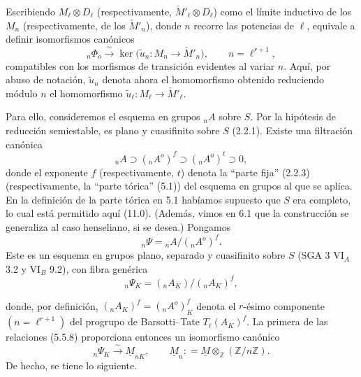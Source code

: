 Escribiendo $M_\ell\otimes D_\ell$ (respectivamente,
$\check M'_\ell\otimes D_\ell$) como el límite inductivo de los $M_n$
(respectivamente, de los $\check M'_n$), donde $n$ recorre las
potencias de $\ell$, equivale a definir isomorfismos canónicos
\begin{equation}\tag{11.6.4}
{}_n\Phi_o\xrightarrow{\ \sim\ }
 \ker\bigl(\widetilde u_n:M_n\longrightarrow\check M'_n\bigr),
 \qquad n=\ell^{r+1},
\end{equation}
compatibles con los morfismos de transición evidentes al variar $n$.
Aquí, por abuso de notación, $\widetilde u_n$ denota ahora el
homomorfismo obtenido reduciendo módulo $n$ el homomorfismo
$\widetilde u_\ell:M_\ell\longrightarrow\check M'_\ell$.

Para ello, consideremos el esquema en grupos ${}_nA$ sobre $S$. Por la
hipótesis de reducción semiestable, es plano y cuasifinito sobre $S$
(2.2.1). Existe una filtración canónica
\begin{equation}\tag{11.6.5}
{}_nA\supset({}_nA^o)^f\supset({}_nA^o)^t\supset0,
\end{equation}
donde el exponente $f$ (respectivamente, $t$) denota la ``parte fija''
(2.2.3) (respectivamente, la ``parte tórica'' (5.1)) del esquema en
grupos al que se aplica. En la definición de la parte tórica en 5.1
habíamos supuesto que $S$ era completo, lo cual está permitido aquí
(11.0). (Además, vimos en 6.1 que la construcción se generaliza al caso
henseliano, si se desea.) Pongamos
\begin{equation}\tag{11.6.6}
{}_n\Psi={}_nA/({}_nA^o)^f.
\end{equation}
Este es un esquema en grupos plano, separado y cuasifinito sobre $S$
(SGA 3 $\mathrm{VI}_A$ 3.2 y $\mathrm{VI}_B$ 9.2), con fibra genérica
\begin{equation*}
{}_n\Psi_K=({}_nA_K)/({}_nA_K)^f,
\end{equation*}


donde, por definición,
$({}_nA_K)^f=({}_nA^o)^f_K$ denota el $r$-ésimo componente
$(n=\ell^{r+1})$ del progrupo de Barsotti--Tate $T_\ell(A_K)^f$. La
primera de las relaciones (5.5.8) proporciona entonces un isomorfismo
canónico
\begin{equation}\tag{11.6.7}
{}_n\Psi_K\xrightarrow{\ \sim\ }\underline M_{nK},
\qquad
\underline M_n\mathrel{\mathop:}=\underline M
 \otimes_{\mathbb Z}(\mathbb Z/n\mathbb Z).
\end{equation}
De hecho, se tiene lo siguiente.

